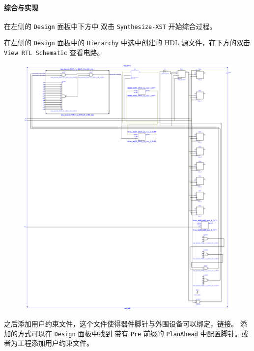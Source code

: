 \documentclass{ctexart}
\begin{document}
        \paragraph{综合与实现}

		在左侧的 \verb|Design| 面板中下方中 双击 \verb|Synthesize-XST| 开始综合过程。
		

        在左侧的 \verb|Design| 面板中的 \verb|Hierarchy| 中选中创建的 HDL 源文件，在下方的双击 \verb|View RTL Schematic| 查看电路。

        \begin{figure}
\centering
\includegraphics[width=1\linewidth]{report1-circiut-1.jpg}
\caption[Circuit]{}
\label{fig:report1-circiut-1}
\end{figure}

        之后添加用户约束文件，这个文件使得器件脚针与外围设备可以绑定，链接。
        添加的方式可以在 \verb|Design| 面板中找到 带有 \verb|Pre| 前缀的 \verb|PlanAhead| 中配置脚针。或者为工程添加用户约束文件。
		
\end{document}
